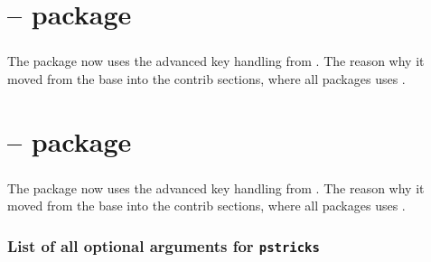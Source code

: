 \documentclass[11pt,english,BCOR10mm,DIV12,bibliography=totoc,parskip=false,smallheadings
    headexclude,footexclude,oneside]{pst-doc}
\begin{document}
\part{ -- package}

\section{}

The package  now uses the advanced key handling from . The reason
why it moved from the base into the contrib sections, where all packages uses .

\part{ -- package}

\section{}

The package  now uses the advanced key handling from . The reason
why it moved from the base into the contrib sections, where all packages uses .


\clearpage
\section{List of all optional arguments for \texttt{pstricks}}




\nocite{*}



\printindex
\end{document}
